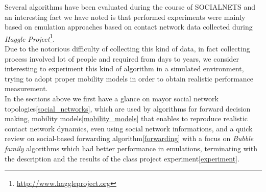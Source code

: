 Several algorithms have been evaluated during the course of SOCIALNETS and an interesting fact we have noted is that performed experiments were mainly based on emulation approaches\cite{bubble} based on contact network data collected during \emph{Haggle Project}\footnote{\url{http://www.haggleproject.org}}.\\
Due to the notorious difficulty of collecting this kind of data, in fact collecting process involved lot of people and required from days to years, we consider interesting to experiment this kind of algorithm in a simulated environment, trying to adopt proper mobility models in order to obtain realistic performance measurement.\\
In the sections above we first have a glance on mayor social network topologies\ref{social_networks}, which are used by algorithms for forward decision making, mobility models\ref{mobility_models} that enables to reproduce realistic contact network dynamics, even using social network informations, and a quick review on social-based forwarding algorithm\ref{forwarding} with a focus on \emph{Bubble family} algorithms\cite{bubble} which had better performance in emulations, terminating with the description and the results of the class project experiment\ref{experiment}. \\ 

